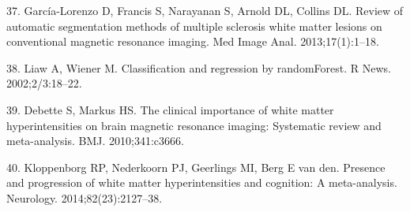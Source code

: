 \documentclass[11pt,]{article}
\begin{document}
\hypertarget{ref-Garcia-Lorenzo:2013aa}{}
37. García-Lorenzo D, Francis S, Narayanan S, Arnold DL, Collins DL.
Review of automatic segmentation methods of multiple sclerosis white
matter lesions on conventional magnetic resonance imaging. Med Image
Anal. 2013;17(1):1--18.

\hypertarget{ref-liaw2002}{}
38. Liaw A, Wiener M. Classification and regression by randomForest. R
News. 2002;2/3:18--22.

\hypertarget{ref-Debette:2010aa}{}
39. Debette S, Markus HS. The clinical importance of white matter
hyperintensities on brain magnetic resonance imaging: Systematic review
and meta-analysis. BMJ. 2010;341:c3666.

\hypertarget{ref-Kloppenborg:2014aa}{}
40. Kloppenborg RP, Nederkoorn PJ, Geerlings MI, Berg E van den.
Presence and progression of white matter hyperintensities and cognition:
A meta-analysis. Neurology. 2014;82(23):2127--38.
\end{document}
